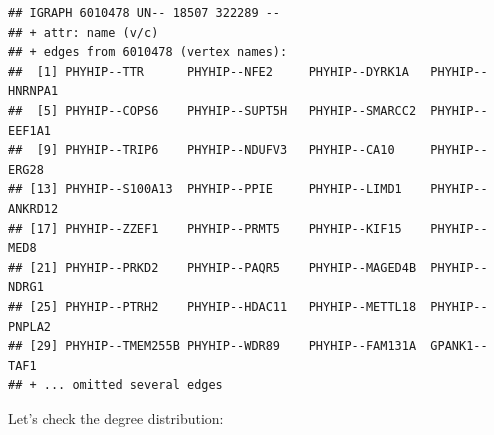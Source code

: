 \documentclass[
]{book}
\newenvironment{Shaded}{\begin{snugshade}}{\end{snugshade}}
\newcommand{\AttributeTok}[1]{\textcolor[rgb]{0.77,0.63,0.00}{#1}}
\newcommand{\FunctionTok}[1]{\textcolor[rgb]{0.00,0.00,0.00}{#1}}
\newcommand{\NormalTok}[1]{#1}
\newcommand{\OtherTok}[1]{\textcolor[rgb]{0.56,0.35,0.01}{#1}}
\newcommand{\SpecialCharTok}[1]{\textcolor[rgb]{0.00,0.00,0.00}{#1}}
\newcommand{\StringTok}[1]{\textcolor[rgb]{0.31,0.60,0.02}{#1}}
\begin{document}
\begin{verbatim}
## IGRAPH 6010478 UN-- 18507 322289 -- 
## + attr: name (v/c)
## + edges from 6010478 (vertex names):
##  [1] PHYHIP--TTR      PHYHIP--NFE2     PHYHIP--DYRK1A   PHYHIP--HNRNPA1 
##  [5] PHYHIP--COPS6    PHYHIP--SUPT5H   PHYHIP--SMARCC2  PHYHIP--EEF1A1  
##  [9] PHYHIP--TRIP6    PHYHIP--NDUFV3   PHYHIP--CA10     PHYHIP--ERG28   
## [13] PHYHIP--S100A13  PHYHIP--PPIE     PHYHIP--LIMD1    PHYHIP--ANKRD12 
## [17] PHYHIP--ZZEF1    PHYHIP--PRMT5    PHYHIP--KIF15    PHYHIP--MED8    
## [21] PHYHIP--PRKD2    PHYHIP--PAQR5    PHYHIP--MAGED4B  PHYHIP--NDRG1   
## [25] PHYHIP--PTRH2    PHYHIP--HDAC11   PHYHIP--METTL18  PHYHIP--PNPLA2  
## [29] PHYHIP--TMEM255B PHYHIP--WDR89    PHYHIP--FAM131A  GPANK1--TAF1    
## + ... omitted several edges
\end{verbatim}

Let's check the degree distribution:

\begin{Shaded}
\end{Shaded}
\end{document}
